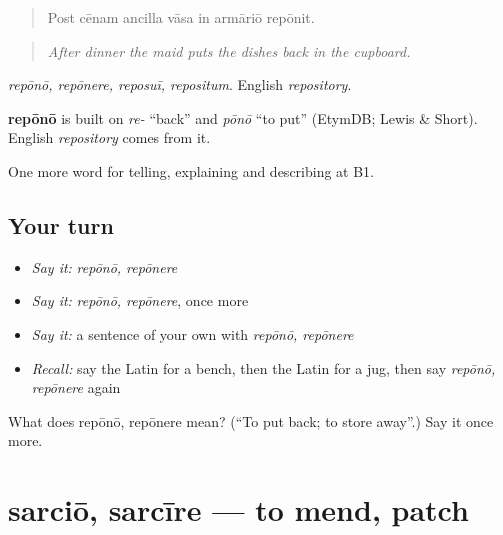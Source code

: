 \begin{quote}
Post cēnam ancilla vāsa in armāriō repōnit.
\end{quote}

\begin{quote}
\emph{After dinner the maid puts the dishes back in the cupboard.}
\end{quote}

\emph{repōnō, repōnere, reposuī, repositum}. English \emph{repository}.

\begin{cousinweb}
\textbf{repōnō} is built on \emph{re-} \textquotedblleft{}back\textquotedblright{} and \emph{pōnō} \textquotedblleft{}to put\textquotedblright{} (EtymDB; Lewis \& Short). English \emph{repository} comes from it.
\end{cousinweb}

\begin{grammarlens}[title={What you've built}]
One more word for telling, explaining and describing at B1.
\end{grammarlens}

\subsection*{Your turn}
\begin{itemize}
\raggedright
  \item \emph{Say it:} \emph{repōnō, repōnere}
  \item \emph{Say it:} \emph{repōnō, repōnere}, once more
  \item \emph{Say it:} a sentence of your own with \emph{repōnō, repōnere}
  \item \emph{Recall:} say the Latin for a bench, then the Latin for a jug, then say \emph{repōnō, repōnere} again
\end{itemize}

\begin{tcolorbox}[breakable,colback=teal!4,colframe=teal!35!black,title={Before you move on}]
What does repōnō, repōnere mean? (\textquotedblleft{}To put back; to store away\textquotedblright{}.) Say it once more.
\end{tcolorbox}
\section[sarciō, sarcīre]{sarciō, sarcīre — to mend, patch}

\label{lesson:LA-C554-sarcio}



